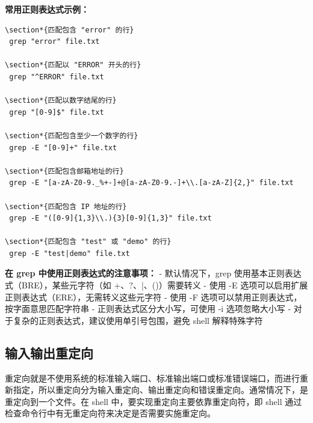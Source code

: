 \documentclass[12pt,UTF8]{ctexbook}
\begin{document}
\textbf{常用正则表达式示例：}
\begin{verbatim}
\section*{匹配包含 "error" 的行}
 grep "error" file.txt

\section*{匹配以 "ERROR" 开头的行}
 grep "^ERROR" file.txt

\section*{匹配以数字结尾的行}
 grep "[0-9]$" file.txt

\section*{匹配包含至少一个数字的行}
 grep -E "[0-9]+" file.txt

\section*{匹配包含邮箱地址的行}
 grep -E "[a-zA-Z0-9._%+-]+@[a-zA-Z0-9.-]+\\.[a-zA-Z]{2,}" file.txt

\section*{匹配包含 IP 地址的行}
 grep -E "([0-9]{1,3}\\.){3}[0-9]{1,3}" file.txt

\section*{匹配包含 "test" 或 "demo" 的行}
 grep -E "test|demo" file.txt
\end{verbatim}

\textbf{在 grep 中使用正则表达式的注意事项：}
- 默认情况下，grep 使用基本正则表达式（BRE），某些元字符（如 +、?、|、()）需要转义
- 使用 -E 选项可以启用扩展正则表达式（ERE），无需转义这些元字符
- 使用 -F 选项可以禁用正则表达式，按字面意思匹配字符串
- 正则表达式区分大小写，可使用 -i 选项忽略大小写
- 对于复杂的正则表达式，建议使用单引号包围，避免 shell 解释特殊字符

\subsection{输入输出重定向}
重定向就是不使用系统的标准输入端口、标准输出端口或标准错误端口，而进行重新指定，所以重定向分为输入重定向、输出重定向和错误重定向。通常情况下，是重定向到一个文件。在 shell 中，要实现重定向主要依靠重定向符，即 shell 通过检查命令行中有无重定向符来决定是否需要实施重定向。
\end{document}
